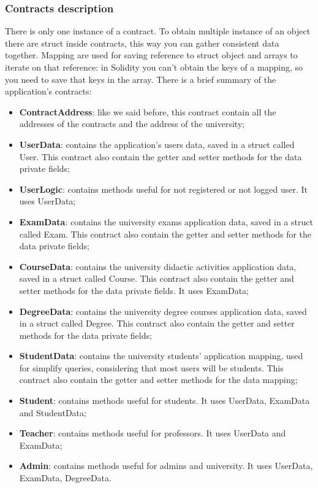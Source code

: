 \subsubsection{Contracts description}
There is only one instance of a contract. To obtain multiple instance of an object there are struct inside contracts, this way you can gather consistent data together. Mapping are used for saving reference to struct object and arrays to iterate on that reference: in Solidity you can't obtain the keys of a mapping, so you need to save that keys in the array.
There is a brief summary of the application's contracts:
\begin{itemize}
	\item \textbf{ContractAddress}: like we said before, this contract contain all the addresses of the contracts and the address of the university;
	\item \textbf{UserData}: contains the application's users data, saved in a struct called User. This contract also contain the getter and setter methods for the data private fields;
	\item \textbf{UserLogic}: contains methods useful for not registered or not logged user. It uses UserData;
	\item \textbf{ExamData}: contains the university exams application data, saved in a struct called Exam. This contract also contain the getter and setter methods for the data private fields;
	\item \textbf{CourseData}: contains the university didactic activities application data, saved in a struct called Course. This contract also contain the getter and setter methods for the data  private fields. It uses ExamData;
	\item \textbf{DegreeData}: contains the university degree courses application data, saved in a struct called Degree. This contract also contain the getter and setter methods for the data private fields;
	\item \textbf{StudentData}: contains the university students' application mapping, used for simplify queries, considering that most users will be students. This contract also contain the getter and setter methods for the data mapping;
	\item \textbf{Student}: contains methods useful for students. It uses UserData, ExamData and StudentData;
	\item \textbf{Teacher}: contains methods useful for professors. It uses UserData and ExamData;
	\item \textbf{Admin}: contains methods useful for admins and university. It uses UserData, ExamData, DegreeData.
	
\end{itemize}

